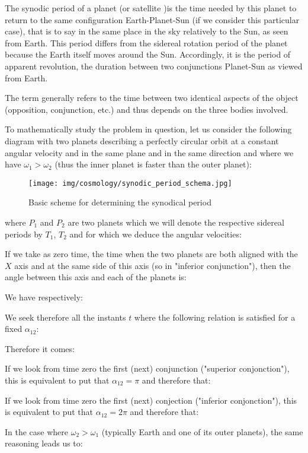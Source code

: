 	The synodic period of a planet (or satellite )is the time needed by this planet to return to the same configuration Earth-Planet-Sun (if we consider this particular case), that is to say in the same place in the sky relatively to the Sun, as seen from Earth. This period differs from the sidereal rotation period of the planet because the Earth itself moves around the Sun. Accordingly, it is the period of apparent revolution, the duration between two conjunctions Planet-Sun as viewed from Earth.

	The term generally refers to the time between two identical aspects of the object (opposition, conjunction, etc.) and thus depends on the three bodies involved.
	
	To mathematically study the problem in question, let us consider the following diagram with two planets describing a perfectly circular orbit at a constant angular velocity and in the same plane and in the same direction and where we have $\omega_1>\omega_2$ (thus the inner planet is faster than the outer planet):
	\begin{figure}[H]
		\begin{center}
		\texttt{[image: img/cosmology/synodic\_period\_schema.jpg]}
		\end{center}	
		\caption{Basic scheme for determining the synodical period}
	\end{figure}
	where $P_1$ and $P_2$ are two planets which we will denote the respective sidereal  periods by $T_1$, $T_2$ and for which we deduce the angular velocities:
	
	If we take as zero time, the time when the two planets are both aligned with the $X$ axis and at the same side of this axis (so in "inferior conjunction"), then the angle between this axis and each of the planets is:
	
	We have respectively:
	
	We seek therefore all the instants $t$ where the following relation is satisfied for a fixed $\alpha_{12}$:
	
	Therefore it comes:
	
	If we look from time zero the first (next) conjunction ("superior conjonction"), this is equivalent to put that $\alpha_{12}=\pi$ and therefore that:
	
	If we look from time zero the first (next) conjection ("inferior conjonction"),  this is equivalent to put that $\alpha_{12}=2\pi$ and therefore that:
	
	In the case where $\omega_2>\omega_1$ (typically Earth and one of its outer planets), the same reasoning leads us to:
	
